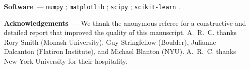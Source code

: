 \documentclass[modern,linenumbers]{aastex631}
\renewcommand{\paragraph}[1]{\medskip\par\noindent\textbf{#1}~---}
\begin{document}




\paragraph{Software}
\texttt{numpy} \citep{numpy};
\texttt{matplotlib} \citep{matplotlib};
\texttt{scipy} \citep{scipy};
\texttt{scikit-learn} \citep{scikit-learn}.


\paragraph{Acknowledgements}
We thank the anonymous referee for a constructive and detailed report that improved the quality of this manuscript.
A.~R.~C. thanks
    Rory Smith (Monash University),
    Guy Stringfellow (Boulder),
    Julianne Dalcanton (Flatiron Institute), and
    Michael Blanton (NYU).
A.~R.~C. thanks New York University for their hospitality.



\end{document}
